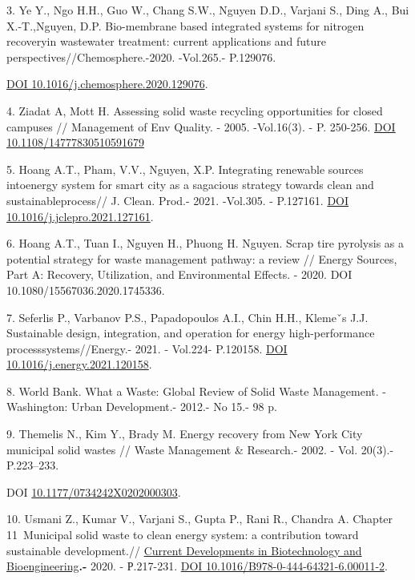 3. Ye Y., Ngo H.H., Guo W., Chang S.W., Nguyen D.D., Varjani S., Ding
A., Bui X.-T.,Nguyen, D.P. Bio-membrane based integrated systems for
nitrogen recoveryin wastewater treatment: current applications and
future perspectives//Chemosphere.-2020. -Vol.265.- P.129076.

\href{https://doi.org/10.1016/j.chemosphere.2020.129076}{DOI
10.1016/j.chemosphere.2020.129076}.

4. Ziadat A, Mott H. Assessing solid waste recycling opportunities for
closed campuses // Management of Env Quality. - 2005. -Vol.16(3). - P.
250-256. \href{https://doi.org/10.1108/14777830510591679}{DOI
10.1108/14777830510591679}

5. Hoang A.T., Pham, V.V., Nguyen, X.P. Integrating renewable sources
intoenergy system for smart city as a sagacious strategy towards clean
and sustainableprocess// J. Clean. Prod.- 2021. -Vol.305. - P.127161.
\href{https://doi.org/\%2010.1016/j.jclepro.2021.127161}{DOI
10.1016/j.jclepro.2021.127161}.

6. Hoang A.T., Tuan I., Nguyen H., Phuong H. Nguyen. Scrap tire
pyrolysis as a potential strategy for waste management pathway: a review
// Energy Sources, Part A: Recovery, Utilization, and Environmental
Effects. - 2020. DOI 10.1080/15567036.2020.1745336.

7. Seferlis P., Varbanov P.S., Papadopoulos A.I., Chin H.H., Klemeˇs
J.J. Sustainable design, integration, and operation for energy
high-performance processsystems//Energy.- 2021. - Vol.224- P.120158.
\href{https://doi.org/10.1016/j.energy.2021.120158}{DOI
10.1016/j.energy.2021.120158}.

8. World Bank. What a Waste: Global Review of Solid Waste Management.
-Washington: Urban Development.- 2012.- No 15.- 98 p.

9. Themelis N., Kim Y., Brady M. Energy recovery from New York City
municipal solid wastes // Waste Management \& Research.- 2002. - Vol.
20(3).- P.223--233.

DOI
\href{http://dx.doi.org/10.1177/0734242X0202000303}{10.1177/0734242X0202000303}.

10. Usmani Z., Kumar V., Varjani S., Gupta P., Rani R., Chandra A.
Chapter 11~Municipal solid waste to clean energy system: a
contribution toward sustainable development.//
\href{https://www.sciencedirect.com/book/9780444643216/current-developments-in-biotechnology-and-bioengineering}{Current
Developments in Biotechnology and Bioengineering}{\bfseries .-} 2020. -
Р.217-231. \href{https://doi.org/10.1016/B978-0-444-64321-6.00011-2}{DOI
10.1016/B978-0-444-64321-6.00011-2}.

